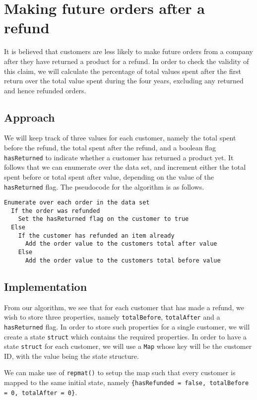 \newpage
\section{Making future orders after a refund}
It is believed that customers are less likely to make future orders from a company after they have returned a product for a refund. In order to check the validity of this claim, we will calculate the percentage of total values spent after the first return over the total value spent during the four years, excluding any returned and hence refunded orders.

\subsection{Approach}
We will keep track of three values for each customer, namely the total spent before the refund, the total spent after the refund, and a boolean flag \lstinline|hasReturned| to indicate whether a customer has returned a product yet. It follows that we can enumerate over the data set, and increment either the total spent before or total spent after value, depending on the value of the \lstinline|hasReturned| flag. The pseudocode for the algorithm is as follows.

\begin{lstlisting}[language=none]
Enumerate over each order in the data set
  If the order was refunded
    Set the hasReturned flag on the customer to true
  Else
    If the customer has refunded an item already
      Add the order value to the customers total after value
    Else
      Add the order value to the customers total before value
\end{lstlisting}

\subsection{Implementation}
From our algorithm, we see that for each customer that has made a refund, we wish to store three properties, namely \lstinline|totalBefore|, \lstinline|totalAfter| and a \lstinline|hasReturned| flag. In order to store such properties for a single customer, we will create a state \lstinline|struct| which contains the required properties. In order to have a state \lstinline|struct| for each customer, we will use a \lstinline|Map| whose key will be the customer ID, with the value being the state structure.


\noindent
We can make use of \lstinline|repmat()| to setup the map such that every customer is mapped to the same initial state, namely \lstinline|{hasRefunded = false, totalBefore = 0, totalAfter = 0}|.

